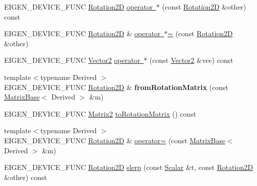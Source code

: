 \begin{DoxyCompactItemize}
E\+I\+G\+E\+N\+\_\+\+D\+E\+V\+I\+C\+E\+\_\+\+F\+U\+NC \mbox{\hyperlink{class_eigen_1_1_rotation2_d}{Rotation2D}} \mbox{\hyperlink{class_eigen_1_1_rotation2_d_a8e898700917c12448a78b5128664be23}{operator $\ast$}} (const \mbox{\hyperlink{class_eigen_1_1_rotation2_d}{Rotation2D}} \&other) const
\item 
E\+I\+G\+E\+N\+\_\+\+D\+E\+V\+I\+C\+E\+\_\+\+F\+U\+NC \mbox{\hyperlink{class_eigen_1_1_rotation2_d}{Rotation2D}} \& \mbox{\hyperlink{class_eigen_1_1_rotation2_d_a54405fc6f9d685c20e04f6f73129bf7c}{operator $\ast$=}} (const \mbox{\hyperlink{class_eigen_1_1_rotation2_d}{Rotation2D}} \&other)
\item 
E\+I\+G\+E\+N\+\_\+\+D\+E\+V\+I\+C\+E\+\_\+\+F\+U\+NC \mbox{\hyperlink{class_eigen_1_1_matrix}{Vector2}} \mbox{\hyperlink{class_eigen_1_1_rotation2_d_a34e472a84d41708b9d36eb4e1e795fad}{operator $\ast$}} (const \mbox{\hyperlink{class_eigen_1_1_matrix}{Vector2}} \&vec) const
\item 
\mbox{\label{class_eigen_1_1_rotation2_d_a3de4849e601e3655c2e57e2a07f02fd7}} 
{\footnotesize template$<$typename Derived $>$ }\\E\+I\+G\+E\+N\+\_\+\+D\+E\+V\+I\+C\+E\+\_\+\+F\+U\+NC \mbox{\hyperlink{class_eigen_1_1_rotation2_d}{Rotation2D}} \& {\bfseries from\+Rotation\+Matrix} (const \mbox{\hyperlink{class_eigen_1_1_matrix_base}{Matrix\+Base}}$<$ Derived $>$ \&m)
\item 
E\+I\+G\+E\+N\+\_\+\+D\+E\+V\+I\+C\+E\+\_\+\+F\+U\+NC \mbox{\hyperlink{class_eigen_1_1_matrix}{Matrix2}} \mbox{\hyperlink{class_eigen_1_1_rotation2_d_a417985ee6adae46447bb1b1d8d17a824}{to\+Rotation\+Matrix}} () const
\item 
{\footnotesize template$<$typename Derived $>$ }\\E\+I\+G\+E\+N\+\_\+\+D\+E\+V\+I\+C\+E\+\_\+\+F\+U\+NC \mbox{\hyperlink{class_eigen_1_1_rotation2_d}{Rotation2D}} \& \mbox{\hyperlink{class_eigen_1_1_rotation2_d_a483efa61d85a46bb94912a68cfee9902}{operator=}} (const \mbox{\hyperlink{class_eigen_1_1_matrix_base}{Matrix\+Base}}$<$ Derived $>$ \&m)
\item 
E\+I\+G\+E\+N\+\_\+\+D\+E\+V\+I\+C\+E\+\_\+\+F\+U\+NC \mbox{\hyperlink{class_eigen_1_1_rotation2_d}{Rotation2D}} \mbox{\hyperlink{class_eigen_1_1_rotation2_d_a47058d6327b801f6987506dcfbffb77f}{slerp}} (const \mbox{\hyperlink{class_eigen_1_1_rotation2_d_ac20c665ece0f197a712a2a39ae72e4e4}{Scalar}} \&t, const \mbox{\hyperlink{class_eigen_1_1_rotation2_d}{Rotation2D}} \&other) const

\end{DoxyCompactItemize}
